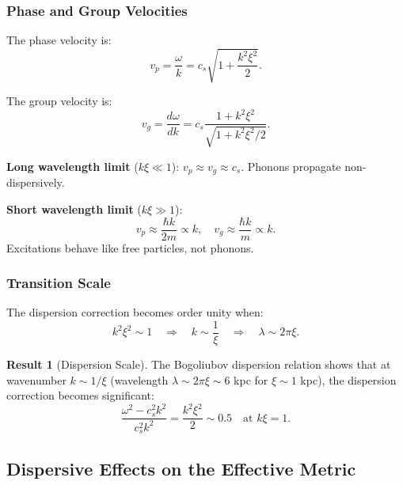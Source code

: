 \documentclass[11pt,a4paper]{article}
\theoremstyle{definition}
\newtheorem{result}{Result}[section]
\theoremstyle{remark}
\begin{document}
\subsubsection{Phase and Group Velocities}

The phase velocity is:
\begin{equation}
v_p = \frac{\omega}{k} = c_s \sqrt{1 + \frac{k^2\xi^2}{2}}.
\end{equation}

The group velocity is:
\begin{equation}
v_g = \frac{d\omega}{dk} = c_s \frac{1 + k^2\xi^2}{\sqrt{1 + k^2\xi^2/2}}.
\end{equation}

\textbf{Long wavelength limit} ($k\xi \ll 1$): $v_p \approx v_g \approx c_s$. Phonons propagate non-dispersively.

\textbf{Short wavelength limit} ($k\xi \gg 1$):
\begin{equation}
v_p \approx \frac{\hbar k}{2m} \propto k, \quad v_g \approx \frac{\hbar k}{m} \propto k.
\end{equation}
Excitations behave like free particles, not phonons.

\subsubsection{Transition Scale}

The dispersion correction becomes order unity when:
\begin{equation}
k^2 \xi^2 \sim 1 \quad \Rightarrow \quad k \sim \frac{1}{\xi} \quad \Rightarrow \quad \lambda \sim 2\pi\xi.
\end{equation}

\begin{result}[Dispersion Scale]
The Bogoliubov dispersion relation shows that at wavenumber $k \sim 1/\xi$ (wavelength $\lambda \sim 2\pi\xi \sim 6$ kpc for $\xi \sim 1$ kpc), the dispersion correction becomes significant:
\begin{equation}
\boxed{\frac{\omega^2 - c_s^2 k^2}{c_s^2 k^2} = \frac{k^2 \xi^2}{2} \sim 0.5 \quad \text{at } k\xi = 1.}
\end{equation}
\end{result}

\subsection{Dispersive Effects on the Effective Metric}
\label{sec:dispersive_metric}
\end{document}
